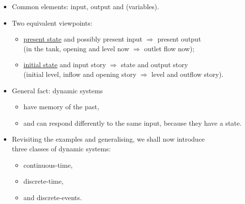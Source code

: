 \begin{frame}
\myPause
 \begin{itemize}[<+-| alert@+>]
 \item Common elements: input, output and  (variables).
 \item Two equivalent viewpoints:
       \begin{itemize}[<+-| alert@+>]
       \item \underline{present state} and possibly present input $\Rightarrow$ present output\\
             (in the tank, opening and level now $\Rightarrow$ outlet flow now);
       \item \underline{initial state} and input story $\Rightarrow$ state and output story\\
             (initial level, inflow and opening story $\Rightarrow$ level and outflow story).
       \end{itemize}
 \item \vspace{2mm}General fact: dynamic systems
       \begin{itemize}[<+-| alert@+>]
       \item have memory of the past,
       \item and can respond differently to the same input, because they have a state.
       \end{itemize}
 \item \vfill Revisiting the examples and generalising, we shall now introduce\\
       three classes of dynamic systems:
       \begin{itemize}[<+-| alert@+>]
       \item continuous-time,
       \item discrete-time,
       \item and discrete-events.
       \end{itemize}
 \end{itemize}
\end{frame}

